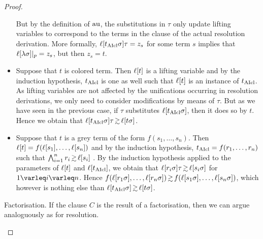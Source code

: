 \documentclass[,%
	draft=false,%
	numbers=noendperiod
	11pt,
	a4paper,
	oneside,%
	openany,
]{memoir}
\begin{document}
\begin{proof}
\begin{description}
\begin{itemize}
					But by the definition of $\operatorname{au}$, the substitutions in $\tau$ only update lifting variables to correspond to the terms in the clause of the actual resolution derivation.
					More formally, $\ell[t_{\operatorname{AIcl}}\sigma]\tau = z_s$ for some term $s$ implies that $\ell[\lambda\sigma]|_{p} = z_s$, but then $z_s = t$.

				\item
					Suppose that $t$ is colored term.
					Then $\ell[t]$ is a lifting variable and by the induction hypothesis, $t_{\operatorname{AIcl}}$ is one as well such that
					$\ell[t]$ is an instance of $t_{\operatorname{AIcl}}$.
					As lifting variables are not affected by the unifications occurring in resolution derivations, we only need to consider modifications by means of $\tau$.
					But as we have seen in the previous case, if $\tau$ substitutes $\ell[t_{\operatorname{AIcl}}\sigma]$, then it does so by $t$.
					Hence we obtain that $\lifboth{t\cl\sigma}\tau \simgeq \lifboth{t\sigma}$.

				\item
					Suppose that $t$ is a grey term of the form $f(s_1, \dots, s_n)$.
					Then $\ell[t] = f(\ell[s_1], \dots, \ell[s_n])$ and by the induction hypothesis, $t_{\operatorname{AIcl}} = f(r_1, \dots, r_n)$ such that
					$\bigwedge_{i=1}^n r_i \simgeq \lifboth{s_i}$ .
					By the induction hypothesis applied to the parameters of $\ell[t]$ and $\ell[t_{\operatorname{AIcl}}]$, we obtain that  $\lifboth{r_i\sigma}\tau \simgeq \lifboth{s_i\sigma}$ for $1\nolinebreak \varleq\nolinebreak i\nolinebreak \varleq\nolinebreak n$.
					Hence $  f(\lifboth{r_1\sigma}, \dots, \lifboth{r_n\sigma}) \simgeq f(\lifboth{s_1\sigma}, \dots, \lifboth{s_n\sigma})$,
					which however is nothing else than
					$\lifboth{t\cl\sigma} \simgeq \lifboth{t\sigma} $.

			\end{itemize}

		\item{Factorisation.}
			If the clause $C$ is the result of a factorisation, then we can argue analoguously as for resolution.
			\qedhere
	\end{description}

\end{proof}
\end{document}

